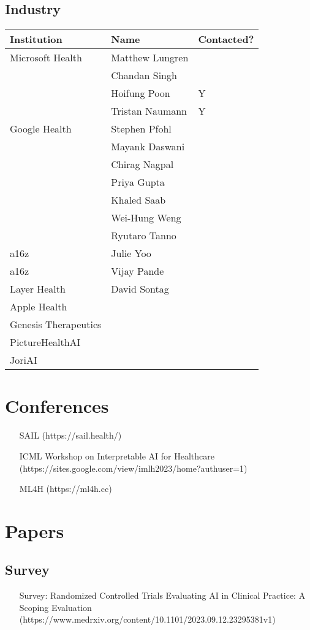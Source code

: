 \subsection{Industry}
\begin{longtable}{|l|l|l|}
\hline
\textbf{Institution} & \textbf{Name} & \textbf{Contacted?} \\
\hline
Microsoft Health & Matthew Lungren & \\
& Chandan Singh & \\
& Hoifung Poon & Y \\
& Tristan Naumann & Y \\
Google Health & Stephen Pfohl & \\
& Mayank Daswani & \\
& Chirag Nagpal & \\
& Priya Gupta & \\
& Khaled Saab & \\
& Wei-Hung Weng & \\
& Ryutaro Tanno & \\
a16z & Julie Yoo & \\
a16z & Vijay Pande & \\
Layer Health & David Sontag & \\
Apple Health & & \\
Genesis Therapeutics & & \\
PictureHealthAI & & \\
JoriAI & & \\
\hline
\end{longtable}

\section{Conferences}
\begin{itemize}
    \item [SAIL](https://sail.health/)
    \item [ICML Workshop on Interpretable AI for Healthcare](https://sites.google.com/view/imlh2023/home?authuser=1)
    \item [ML4H](https://ml4h.cc)
\end{itemize}

\section{Papers}
\subsection{Survey}
\begin{itemize}
    \item [Survey: Randomized Controlled Trials Evaluating AI in Clinical Practice: A Scoping Evaluation](https://www.medrxiv.org/content/10.1101/2023.09.12.23295381v1)
\end{itemize}

